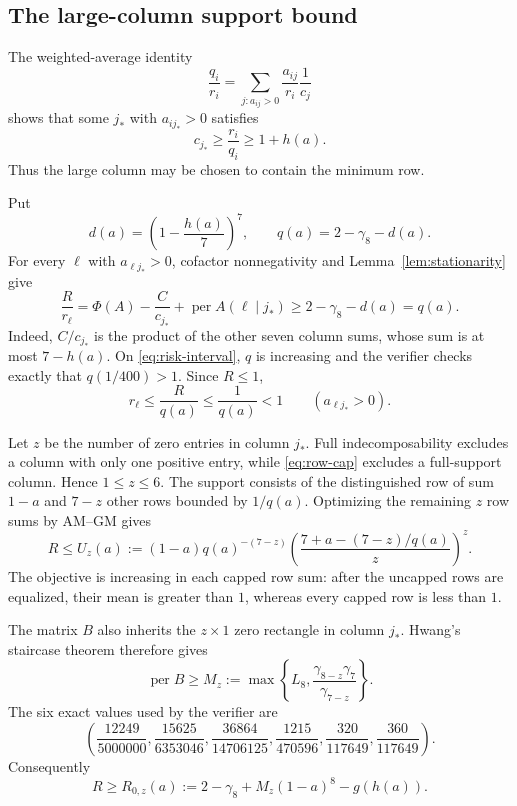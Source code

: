 \documentclass[11pt]{article}
\theoremstyle{remark}
\newcommand{\per}{\operatorname{per}}
\begin{document}
\subsection{The large-column support bound}

The weighted-average identity
\[
 \frac{q_i}{r_i}=\sum_{j:a_{ij}>0}\frac{a_{ij}}{r_i}\frac1{c_j}
\]
shows that some $j_*$ with $a_{ij_*}>0$ satisfies
\begin{equation}\label{eq:distinguished-column}
 c_{j_*}\ge\frac{r_i}{q_i}\ge1+h(a).
\end{equation}
Thus the large column may be chosen to contain the minimum row.

Put
\begin{equation}\label{eq:q-support}
 d(a)=\left(1-\frac{h(a)}7\right)^7,
 \qquad q(a)=2-\gamma_8-d(a).
\end{equation}
For every $\ell$ with $a_{\ell j_*}>0$, cofactor nonnegativity and
Lemma~\ref{lem:stationarity} give
\[
 \frac{R}{r_\ell}
 =\Phi(A)-\frac{C}{c_{j_*}}+\per A(\ell\mid j_*)
 \ge2-\gamma_8-d(a)=q(a).
\]
Indeed, $C/c_{j_*}$ is the product of the other seven column sums, whose sum
is at most $7-h(a)$.  On \eqref{eq:risk-interval}, $q$ is increasing and the
verifier checks exactly that $q(1/400)>1$.  Since $R\le1$,
\begin{equation}\label{eq:row-cap}
 r_\ell\le\frac{R}{q(a)}\le\frac1{q(a)}<1
 \qquad(a_{\ell j_*}>0).
\end{equation}

Let $z$ be the number of zero entries in column $j_*$.  Full
indecomposability excludes a column with only one positive entry, while
\eqref{eq:row-cap} excludes a full-support column.  Hence $1\le z\le6$.
The support consists of the distinguished row of sum $1-a$ and $7-z$ other
rows bounded by $1/q(a)$.  Optimizing the remaining $z$ row sums by AM--GM
gives
\begin{equation}\label{eq:Uz}
 R\le U_z(a):=(1-a)q(a)^{-(7-z)}
 \left(\frac{7+a-(7-z)/q(a)}{z}\right)^z.
\end{equation}
The objective is increasing in each capped row sum: after the uncapped rows
are equalized, their mean is greater than $1$, whereas every capped row is
less than $1$.

The matrix $B$ also inherits the $z\times1$ zero rectangle in column $j_*$.
Hwang's staircase theorem therefore gives
\begin{equation}\label{eq:Mz}
 \per B\ge M_z:=
 \max\left\{L_8,\frac{\gamma_{8-z}\gamma_7}{\gamma_{7-z}}\right\}.
\end{equation}
The six exact values used by the verifier are
\[
 \left(
 \frac{12249}{5000000},
 \frac{15625}{6353046},
 \frac{36864}{14706125},
 \frac{1215}{470596},
 \frac{320}{117649},
 \frac{360}{117649}
 \right).
\]
Consequently
\begin{equation}\label{eq:R0}
 R\ge R_{0,z}(a):=2-\gamma_8+M_z(1-a)^8-g(h(a)).
\end{equation}
\end{document}
